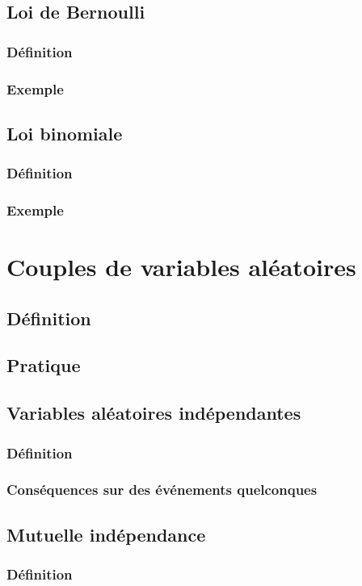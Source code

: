 \documentclass[12pt,a4paper,french]{book}
\begin{document}
		\subsection{Loi de Bernoulli}
			\subsubsection{Définition}
			\subsubsection{Exemple}
		\subsection{Loi binomiale}
			\subsubsection{Définition}
			\subsubsection{Exemple}
	\section{Couples de variables aléatoires}
		\subsection{Définition}
		\subsection{Pratique}
		\subsection{Variables aléatoires indépendantes}
			\subsubsection{Définition}
			\subsubsection{Conséquences sur des événements quelconques}
		\subsection{Mutuelle indépendance}
			\subsubsection{Définition}
\end{document}
